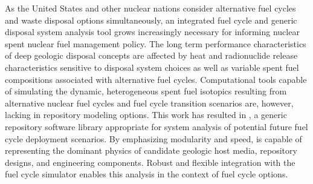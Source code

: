 As the United States and other nuclear nations consider alternative fuel cycles 
and waste disposal options simultaneously, an integrated fuel cycle and generic disposal system 
analysis tool grows increasingly necessary for informing nuclear spent nuclear 
fuel management policy. The long term performance characteristics of deep 
geologic disposal concepts are affected by heat and radionuclide release 
characteristics sensitive to disposal system choices as well as variable spent 
fuel compositions associated  with alternative fuel cycles.  Computational 
tools capable of simulating the dynamic, heterogeneous spent fuel isotopics 
resulting from alternative nuclear fuel cycles and fuel cycle transition 
scenarios are, however, 
lacking in repository modeling  options.  This work has resulted in \Cyder, a 
generic repository software library appropriate for
system analysis of potential future fuel cycle deployment scenarios.  By emphasizing 
modularity and speed, \Cyder is capable of representing the dominant 
physics of candidate geologic host media, repository designs, and engineering components. 
Robust and flexible integration with the \Cyclus fuel cycle simulator
enables this analysis in the context of fuel cycle options.  

\glsresetall
